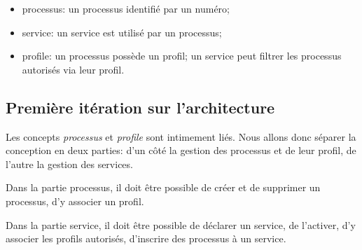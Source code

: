 \documentclass[french, 11pt, a4paper]{article}
\begin{document}
\begin{itemize}
  \item processus: un processus identifié par un numéro;
  \item service: un service est utilisé par un processus;
  \item profile: un processus possède un profil; un service peut filtrer les
    processus autorisés via leur profil.
\end{itemize}

\subsection{Première itération sur l'architecture}

Les concepts \emph{processus} et \emph{profile} sont intimement liés. Nous
allons donc séparer la conception en deux parties: d'un côté la gestion des
processus et de leur profil, de l'autre la gestion des services.

Dans la partie processus, il doit être possible de créer et de supprimer un
processus, d'y associer un profil.

Dans la partie service, il doit être possible de déclarer un service, de
l'activer, d'y associer les profils autorisés, d'inscrire des processus à un
service.
\end{document}
